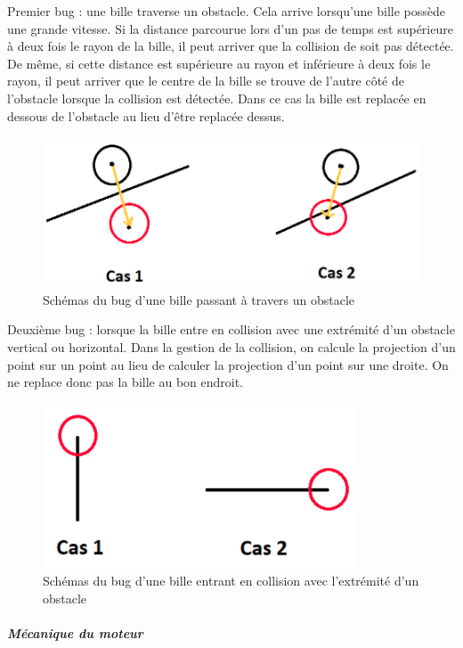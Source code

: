 \documentclass{report}
\begin{document}
Premier bug : une bille traverse un obstacle. Cela arrive lorsqu’une bille possède une grande vitesse. Si la distance parcourue lors d’un pas de temps est supérieure à deux fois le rayon de la bille, il peut arriver que la collision de soit pas détectée. De même, si cette distance est supérieure au rayon et inférieure à deux fois le rayon, il peut arriver que le centre de la bille se trouve de l’autre côté de l’obstacle lorsque la collision est détectée. Dans ce cas la bille est replacée en dessous de l’obstacle au lieu d’être replacée dessus.

\begin{figure}[H]
\centering
\includegraphics[scale=1]{bug_1.PNG}
\caption{Schémas du bug d'une bille passant à travers un obstacle}
\end{figure}

Deuxième bug : lorsque la bille entre en collision avec une extrémité d’un obstacle vertical ou horizontal. Dans la gestion de la collision, on calcule la projection d’un point sur un point au lieu de calculer la projection d’un point sur une droite. On ne replace donc pas la bille au bon endroit.

\begin{figure}[H]
\centering
\includegraphics[scale=1]{bug_2.PNG}
\caption{Schémas du bug d'une bille entrant en collision avec l'extrémité d'un obstacle}
\end{figure}

\newpage
\subparagraph{Mécanique du moteur}
\end{document}
